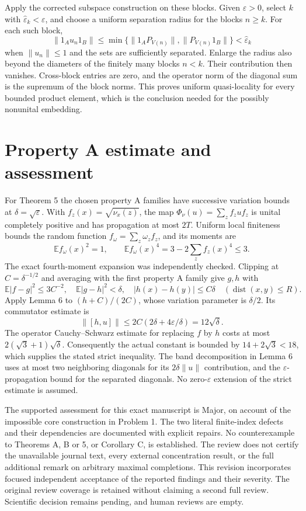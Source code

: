 \documentclass[10pt]{article}
\begin{document}
Apply the corrected subspace construction on these blocks. Given \(\varepsilon>0\), select \(k\) with \(\widehat\varepsilon_k<\varepsilon\), and choose a uniform separation radius for the blocks \(n\ge k\). For each such block, \[\|1_Au_n1_B\|
 \le \min\{\|1_AP_{V(n)}\|,\|P_{V(n)}1_B\|\}
 <\widehat\varepsilon_k\] when \(\|u_n\|\le1\) and the sets are sufficiently separated. Enlarge the radius also beyond the diameters of the finitely many blocks \(n<k\). Their contribution then vanishes. Cross-block entries are zero, and the operator norm of the diagonal sum is the supremum of the block norms. This proves uniform quasi-locality for every bounded product element, which is the conclusion needed for the possibly nonunital embedding.\par
\section*{Property A estimate and assessment}
For Theorem 5 the chosen property A families have successive variation bounds at \(\delta=\sqrt\varepsilon\). With \(f_z(x)=\sqrt{\nu_x(z)}\), the map \(\Phi_\nu(u)=\sum_z f_zuf_z\) is unital completely positive and has propagation at most \(2T\). Uniform local finiteness bounds the random function \(f_\omega=\sum_z\omega_zf_z\), and its moments are \[\mathbb E f_\omega(x)^2=1,\qquad
 \mathbb E f_\omega(x)^4
 =3-2\sum_z f_z(x)^4\le3.\] The exact fourth-moment expansion was independently checked. Clipping at \(C=\delta^{-1/2}\) and averaging with the first property A family give \(g,h\) with \[\mathbb E|f-g|^2\le3C^{-2},\quad
 \mathbb E|g-h|^2<\delta,\quad
 |h(x)-h(y)|\le C\delta\quad(\operatorname{dist}(x,y)\le R).\] Apply Lemma 6 to \((h+C)/(2C)\), whose variation parameter is \(\delta/2\). Its commutator estimate is \[\|[h,u]\|
 \le 2C(2\delta+4\varepsilon/\delta)=12\sqrt\delta.\] The operator Cauchy–Schwarz estimate for replacing \(f\) by \(h\) costs at most \(2(\sqrt3+1)\sqrt\delta\). Consequently the actual constant is bounded by \(14+2\sqrt3<18\), which supplies the stated strict inequality. The band decomposition in Lemma 6 uses at most two neighboring diagonals for its \(2\delta\|u\|\) contribution, and the \(\varepsilon\)-propagation bound for the separated diagonals. No zero-\(\varepsilon\) extension of the strict estimate is assumed.\par
The supported assessment for this exact manuscript is Major, on account of the impossible core construction in Problem 1. The two literal finite-index defects and their dependencies are documented with explicit repairs. No counterexample to Theorems A, B or 5, or Corollary C, is established. The review does not certify the unavailable journal text, every external concentration result, or the full additional remark on arbitrary maximal completions. This revision incorporates focused independent acceptance of the reported findings and their severity. The original review coverage is retained without claiming a second full review. Scientific decision remains pending, and human reviews are empty.\par
\end{document}
